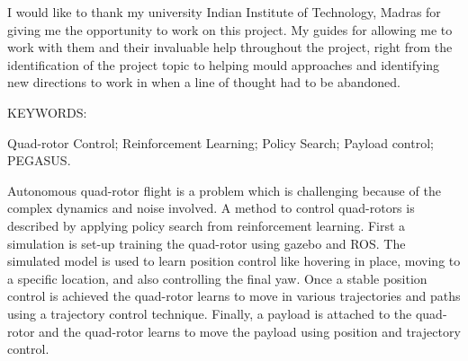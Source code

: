 \documentclass[BTech]{iitmdiss}
\begin{document}
\acknowledgements

I would like to thank my university Indian Institute of Technology, Madras for giving me the opportunity to work on this project. My guides for allowing me to work with them and their invaluable help throughout the project, right from the identification of the project topic to helping mould approaches and identifying new directions to work in when a line of thought had to be abandoned.


\abstract

\noindent KEYWORDS: \hspace*{0.5em} \parbox[t]{4.4in}{Quad-rotor Control; Reinforcement Learning; Policy Search; Payload control; PEGASUS.}

\vspace*{24pt}

\noindent Autonomous quad-rotor flight is a problem which is challenging because of the complex dynamics and noise involved. A method to control quad-rotors is described by applying policy search from reinforcement learning. First a simulation is set-up training the quad-rotor using gazebo and ROS. The simulated model is used to learn position control like hovering in place, moving to a specific location, and also controlling the final yaw. Once a stable position control is achieved the quad-rotor learns to move in various trajectories and paths using a trajectory control technique. Finally, a payload is attached to the quad-rotor and the quad-rotor learns to move the payload using position and trajectory control.

\pagebreak


\begin{singlespace}
\tableofcontents
\thispagestyle{empty}

\listoftables
{}
\listoffigures
{}
\end{singlespace}



\end{document}

